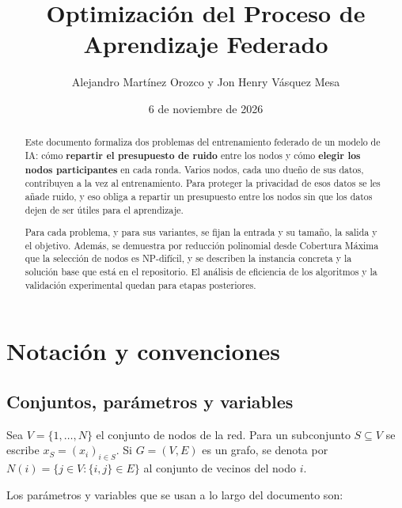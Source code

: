 \documentclass[11pt,a4paper]{article}
\title{Optimización del Proceso de Aprendizaje Federado}
\author{Alejandro Martínez Orozco y Jon Henry Vásquez Mesa}
\affil{Análisis y Diseño de Algoritmos}
\affil{Universidad de Caldas}
\date{6 de noviembre de 2026}
\theoremstyle{definition}
\theoremstyle{plain}
\begin{document}
\maketitle

\begin{abstract}
Este documento formaliza dos problemas del entrenamiento federado de un modelo de IA: cómo \textbf{repartir el presupuesto de ruido} entre los nodos y cómo \textbf{elegir los nodos participantes} en cada ronda. Varios nodos, cada uno dueño de sus datos, contribuyen a la vez al entrenamiento. Para proteger la privacidad de esos datos se les añade ruido, y eso obliga a repartir un presupuesto entre los nodos sin que los datos dejen de ser útiles para el aprendizaje.

Para cada problema, y para sus variantes, se fijan la entrada y su tamaño, la salida y el objetivo. Además, se demuestra por reducción polinomial desde Cobertura Máxima que la selección de nodos es NP-difícil, y se describen la instancia concreta y la solución base que está en el repositorio. El análisis de eficiencia de los algoritmos y la validación experimental quedan para etapas posteriores.
\end{abstract}

\newpage
\tableofcontents
\newpage

\section{Notación y convenciones}

\subsection{Conjuntos, parámetros y variables}

Sea $V=\{1,\dots,N\}$ el conjunto de nodos de la red. Para un subconjunto
$S\subseteq V$ se escribe $x_S=(x_i)_{i\in S}$. Si $G=(V,E)$ es un grafo, se
denota por $N(i)=\{j\in V:\{i,j\}\in E\}$ al conjunto de vecinos del nodo $i$.

Los parámetros y variables que se usan a lo largo del documento son:
\end{document}
